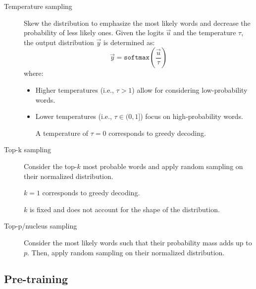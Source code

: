 \begin{description}
\begin{description}
            \item[Temperature sampling]
                Skew the distribution to emphasize the most likely words and decrease the probability of less likely ones. Given the logits $\vec{u}$ and the temperature $\tau$, the output distribution $\vec{y}$ is determined as:
                \[ \vec{y} = \texttt{softmax}\left( \frac{\vec{u}}{\tau} \right) \]
                where:
                \begin{itemize}
                    \item Higher temperatures (i.e., $\tau > 1$) allow for considering low-probability words.
                    \item Lower temperatures (i.e., $\tau \in (0, 1]$) focus on high-probability words.
                    \begin{remark}
                        A temperature of $\tau = 0$ corresponds to greedy decoding.
                    \end{remark}
                \end{itemize}


            \item[Top-k sampling]
                Consider the top-$k$ most probable words and apply random sampling on their normalized distribution.

                \begin{remark}
                    $k=1$ corresponds to greedy decoding.
                \end{remark}

                \begin{remark}
                    $k$ is fixed and does not account for the shape of the distribution.
                \end{remark}

            \item[Top-p/nucleus sampling]
                Consider the most likely words such that their probability mass adds up to $p$. Then, apply random sampling on their normalized distribution.
        \end{description}
\end{description}


\subsection{Pre-training}


